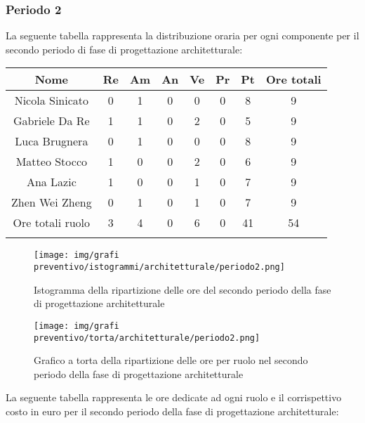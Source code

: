\newpage
\subsubsection{Periodo 2}
%
La seguente tabella rappresenta la distribuzione oraria per ogni componente per il secondo periodo di fase di progettazione architetturale:

	\setlength\extrarowheight{5pt}
	\begin{tabularx}{\textwidth}{|ccccccc|c|}
		\hline
		\rowcolor{white}
		\textbf{Nome} & \textbf{Re} & \textbf{Am} & \textbf{An} & \textbf{Ve} & \textbf{Pr}& \textbf{Pt} & \textbf{Ore totali} \\
		\hline
		Nicola Sinicato &0&1&0&0&0&8&9 \\
		Gabriele Da Re &1&1&0&2&0&5&9 \\
		Luca Brugnera &0&1&0&0&0&8&9 \\
		Matteo Stocco &1&0&0&2&0&6&9 \\
		Ana Lazic &1&0&0&1&0&7&9 \\
		Zhen Wei Zheng &0&1&0&1&0&7&9 \\
		\hline
		Ore totali ruolo &3&4&0&6&0&41&54 \\
		\hline
		\rowcolor{white}
		\caption{Distribuzione oraria durante il secondo periodo di progettazione architetturale per ruolo e persona}
	\end{tabularx}
	\vspace{10pt}
	
\begin{figure}[H]
    \centering
    \texttt{[image: img/grafi preventivo/istogrammi/architetturale/periodo2.png]}
    \caption{Istogramma della ripartizione delle ore del secondo periodo della fase di progettazione architetturale}
\end{figure}
\begin{figure}[H]
    \centering
    \texttt{[image: img/grafi preventivo/torta/architetturale/periodo2.png]}
    \caption{Grafico a torta della ripartizione delle ore per ruolo nel secondo periodo della fase di progettazione architetturale}
\end{figure}
La seguente tabella rappresenta le ore dedicate ad ogni ruolo e il corrispettivo costo in euro per il secondo periodo della fase di progettazione architetturale:

